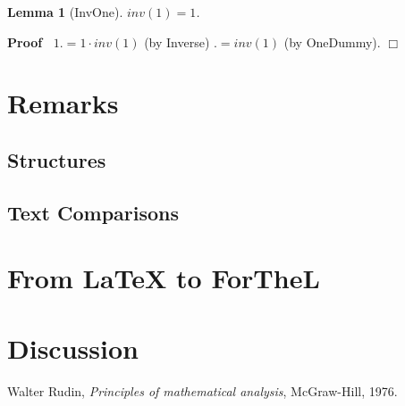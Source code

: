 \documentclass{article}
\newenvironment{forthel}{\begin{leftbar}}{\end{leftbar}}
\newenvironment{proof}{\noindent\textbf{Proof\ }}{\hspace*{\fill}$\Box$\medskip}
\newtheorem{lemma}{Lemma}
\begin{document}
\begin{forthel}
	
	\begin{lemma}[InvOne]
	$inv(1) = 1$.
	\end{lemma}
	\begin{proof}
	$1 .= 1 \cdot inv(1)$ (by Inverse)
	$.= inv(1)$ (by OneDummy).
	\end{proof}   
	
\end{forthel}


\section{Remarks}
\subsection{Structures}


\subsection{Text Comparisons}



\section{{From \LaTeX} to ForTheL}



\section{Discussion}


\begin{thebibliography}{1}

  Walter Rudin,
  \textit{Principles of mathematical analysis},
  McGraw-Hill,
  1976.

\end{thebibliography}
  
\end{document}

